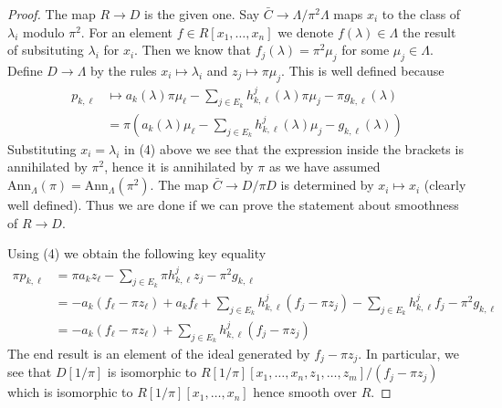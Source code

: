 \begin{proof}
\medskip\noindent
The map $R \to D$ is the given one.
Say $\bar C \to \Lambda/\pi^2\Lambda$ maps $x_i$
to the class of $\lambda_i$ modulo $\pi^2$. For an element
$f \in R[x_1, \ldots, x_n]$ we denote $f(\lambda) \in \Lambda$
the result of subsituting $\lambda_i$ for $x_i$. Then we know that
$f_j(\lambda) = \pi^2 \mu_j$ for some $\mu_j \in \Lambda$.
Define $D \to \Lambda$ by the rules $x_i \mapsto \lambda_i$ and
$z_j \mapsto \pi\mu_j$. This is well defined because
\begin{align*}
p_{k, \ell} & \mapsto
a_k(\lambda) \pi \mu_\ell -
\sum\nolimits_{j \in E_k} h_{k, \ell}^j(\lambda) \pi \mu_j
- \pi g_{k, \ell}(\lambda) \\
& =
\pi\left(a_k(\lambda) \mu_\ell -
\sum\nolimits_{j \in E_k} h_{k, \ell}^j(\lambda) \mu_j
- g_{k, \ell}(\lambda)\right)
\end{align*}
Substituting $x_i = \lambda_i$ in (4) above we see that the expression
inside the brackets is annihilated by $\pi^2$, hence it is annihilated
by $\pi$ as we have assumed
$\text{Ann}_\Lambda(\pi) = \text{Ann}_\Lambda(\pi^2)$.
The map $\bar C \to D/\pi D$ is determined by $x_i \mapsto x_i$
(clearly well defined). Thus we are done if we can prove the statement
about smoothness of $R \to D$.

\medskip\noindent
Using (4) we obtain the following key equality
\begin{align*}
\pi p_{k, \ell} & =
\pi a_k z_\ell - \sum\nolimits_{j \in E_k} \pi h_{k, \ell}^jz_j
- \pi^2 g_{k, \ell} \\
& =
- a_k (f_\ell - \pi z_\ell) + a_k f_\ell +
\sum\nolimits_{j \in E_k} h_{k, \ell}^j (f_j - \pi z_j) -
\sum\nolimits_{j \in E_k} h_{k, \ell}^j f_j - \pi^2 g_{k, \ell} \\
& =
-a_k(f_\ell - \pi z_\ell) +
\sum\nolimits_{j \in E_k} h_{k, \ell}^j(f_j - \pi z_j)
\end{align*}
The end result is an element of the ideal generated by $f_j - \pi z_j$.
In particular, we see that $D[1/\pi]$ is isomorphic to
$R[1/\pi][x_1, \ldots, x_n, z_1, \ldots, z_m]/(f_j - \pi z_j)$
which is isomorphic to $R[1/\pi][x_1, \ldots, x_n]$ hence smooth
over $R$.


\end{proof}
